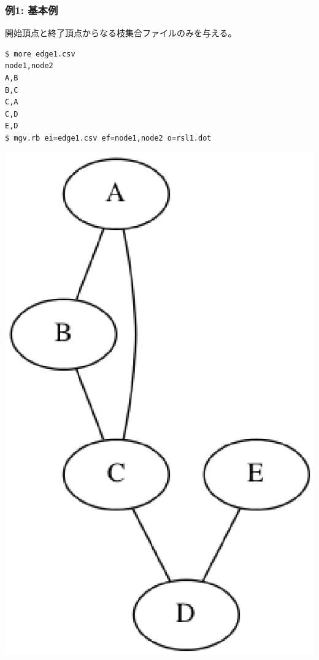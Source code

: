 \subsubsection*{例1: 基本例}

開始頂点と終了頂点からなる枝集合ファイルのみを与える。


\begin{Verbatim}[baselinestretch=0.7,frame=single]
$ more edge1.csv
node1,node2
A,B
B,C
C,A
C,D
E,D
$ mgv.rb ei=edge1.csv ef=node1,node2 o=rsl1.dot
\end{Verbatim}
\begin{minipage}{1.0\hsize}
\begin{center}
\includegraphics[scale=0.5]{figure/mgv1.eps}
\end{center}
\end{minipage}
